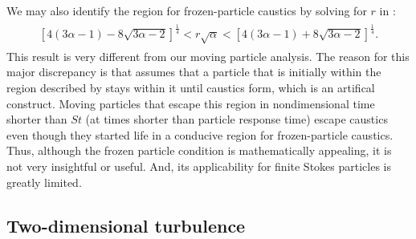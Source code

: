 \documentclass[../Rajarshi-thesis-draft.tex]{subfiles}
\begin{document}
  We may also identify the region for frozen-particle caustics by solving for $r$ in :
  \begin{align}
  \label{int-caustics-sol}
  \begin{split}
    \left[ 4 (3 \alpha -1) - 8 \sqrt{3 \alpha -2}\right]^{\frac{1}{4}} < r\sqrt{\alpha} < \left[ 4 (3 \alpha -1) + 8 \sqrt{3 \alpha -2}\right]^{\frac{1}{4}}.
  \end{split}
  \end{align}
  This result is very different from our moving particle analysis. The reason for this major discrepancy is that  assumes that a particle that is initially within the region described by  stays within it until caustics form, {which is an artifical construct}. Moving particles that escape this region in {nondimensional} time shorter than $St$ ({at times shorter than particle response time}) escape caustics even though they started life in a conducive region for frozen-particle caustics. {Thus, although the frozen particle condition is mathematically appealing, it is not very insightful or useful. And, its applicability for finite Stokes particles is greatly limited.}

\subsection{Two-dimensional turbulence}\label{int-turb}
\end{document}
